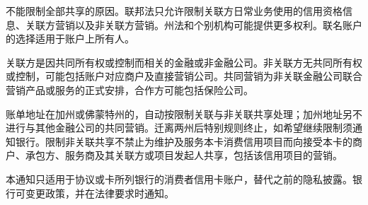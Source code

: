 \documentclass[UTF8,fontset=none,11pt,a4paper]{ctexart}
\begin{document}
不能限制全部共享的原因。联邦法只允许限制关联方日常业务使用的信用资格信息、关联方营销以及非关联方营销。州法和个别机构可能提供更多权利。联名账户的选择适用于账户\allowbreak\mbox{上所有人。}


关联方是因共同所有权或控制而相关的金融或非金融公司。非关联方无共同所有权或控制，可能包括账户对应商户及直接营销公司。共同营销为非关联金融公司联合营销产品或服务的正式安排，合作方可能包括\allowbreak\mbox{保险公司。}


账单地址在加州或佛蒙特州的，自动按限制关联与非关联共享处理；加州地址另不进行与其他金融公司的共同营销。迁离两州后特别规则终止，如希望继续限制须通知银行。限制非关联共享不禁止为维护及服务本卡消费信用项目而向接受本卡的商户、承包方、服务商及其关联方或项目发起人共享，包括该信用项\allowbreak\mbox{目的营销。}


本通知只适用于协议或卡所列银行的消费者信用卡账户，替代之前的隐私披露。银行可变更政策，并在法律要\allowbreak\mbox{求时通知。}
\end{document}
